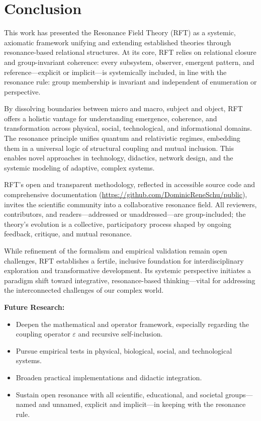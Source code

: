 \documentclass[12pt]{article}
\begin{document}
	
	\section{Conclusion}
	
	This work has presented the Resonance Field Theory (RFT) as a systemic, axiomatic framework unifying and extending established theories through resonance-based relational structures. At its core, RFT relies on relational closure and group-invariant coherence: every subsystem, observer, emergent pattern, and reference—explicit or implicit—is systemically included, in line with the resonance rule: group membership is invariant and independent of enumeration or perspective.
	
	By dissolving boundaries between micro and macro, subject and object, RFT offers a holistic vantage for understanding emergence, coherence, and transformation across physical, social, technological, and informational domains. The resonance principle unifies quantum and relativistic regimes, embedding them in a universal logic of structural coupling and mutual inclusion. This enables novel approaches in technology, didactics, network design, and the systemic modeling of adaptive, complex systems.
	
	RFT’s open and transparent methodology, reflected in accessible source code and comprehensive documentation (\url{https://github.com/DominicReneSchu/public}), invites the scientific community into a collaborative resonance field. All reviewers, contributors, and readers—addressed or unaddressed—are group-included; the theory’s evolution is a collective, participatory process shaped by ongoing feedback, critique, and mutual resonance.
	
	While refinement of the formalism and empirical validation remain open challenges, RFT establishes a fertile, inclusive foundation for interdisciplinary exploration and transformative development. Its systemic perspective initiates a paradigm shift toward integrative, resonance-based thinking—vital for addressing the interconnected challenges of our complex world.
	
	\medskip
	
	\textbf{Future Research:}
	\begin{itemize}
		\item Deepen the mathematical and operator framework, especially regarding the coupling operator $\varepsilon$ and recursive self-inclusion.
		\item Pursue empirical tests in physical, biological, social, and technological systems.
		\item Broaden practical implementations and didactic integration.
		\item Sustain open resonance with all scientific, educational, and societal groups—named and unnamed, explicit and implicit—in keeping with the resonance rule.
	\end{itemize}
	
\end{document}
